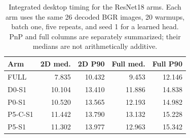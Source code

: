 \begin{table}[t]\centering\small
\caption{Integrated desktop timing for the ResNet18 arms. Each arm uses the same 26 decoded BGR images, 20 warmups, batch one, five repeats, and seed 1 for a learned head. PnP and full columns are separately summarized; their medians are not arithmetically additive.}\label{tab:resnetruntime}
\begin{tabular}{lrrrr}\toprule
Arm & 2D med. & 2D P90 & Full med. & Full P90\\\midrule
FULL & 7.835 & 10.432 & 9.453 & 12.146\\
D0-S1 & 10.104 & 13.410 & 11.886 & 14.838\\
P0-S1 & 10.520 & 13.565 & 12.193 & 14.982\\
P5-C-S1 & 11.442 & 13.790 & 13.132 & 15.228\\
P5-S1 & 11.302 & 13.977 & 12.963 & 15.342\\
\bottomrule\end{tabular}
\end{table}
